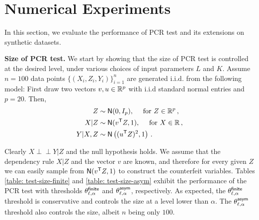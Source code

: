 \documentclass[11pt]{article}
\newcommand{\indep}{\perp \!\!\! \perp}
\def\normal{\mathsf{N}}
\begin{document}

\section{Numerical Experiments}\label{sec: numerical}

In this section, we evaluate the performance of PCR test and its extensions on synthetic datasets. 
\medskip

\noindent \textbf{Size of PCR test.} We start by showing that the size of PCR test is controlled at the desired level, under various choices of input parameters $L$ and $K$. Assume $n=100$ data points $\{(X_i,Z_i,Y_i)\}_{i=1}^{n}$ are generated i.i.d. from the following model: First draw two vectors $v, u\in {\mathbb R}^p$ with i.i.d standard normal entries and $p=20$. Then,   
\begin{align}
	Z&\sim \normal(0,I_p),\quad \text{ for }Z\in \reals^p\,,\nonumber\\
	X|Z&\sim \normal(v^\sT Z,1),\quad\text{ for }X\in \reals\,,\label{eq:example-size}\\
	Y|X,Z&\sim \normal\left((u^\sT Z)^2,1\right)\nonumber\,.
\end{align} 

Clearly $X\indep Y|Z$ and the null hypothesis holds. We assume that the dependency rule $X|Z$ and the vector $v$ are known, and  therefore for every given $Z$ we can easily sample from $\normal(v^\sT Z,1)$ to construct the counterfeit variables.  Tables \ref{table: test-size-finite} and \ref{table: test-size-asym} exhibit the performance of the PCR test with thresholds $\theta^{\mathsf{finite}}_{\ell,\alpha}$ and $\theta^{\mathsf{asym}}_{\ell,\alpha}$, respectively. As expected, the $\theta^{\mathsf{finite}}_{\ell,\alpha}$ threshold is conservative and controls the size at a level lower than $\alpha$. The $\theta^{\mathsf{asym}}_{\ell,\alpha}$ threshold also controls the size, albeit $n$ being only $100$.  
\end{document}
